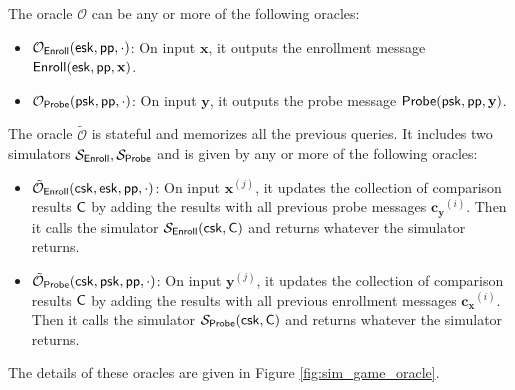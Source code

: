 The oracle $\mathcal{O}$ can be any or more of the following oracles:

\begin{itemize}

	\item $\mathcal{O}_{\sf Enroll}({\sf esk}, {\sf pp}, \cdot)$: On input $\mathbf{x}$, it outputs the enrollment message ${\sf Enroll}({\sf esk}, {\sf pp}, \mathbf{x})$.

	\item $\mathcal{O}_{\sf Probe}({\sf psk}, {\sf pp}, \cdot)$: On input $\mathbf{y}$, it outputs the probe message ${\sf Probe}({\sf psk}, {\sf pp}, \mathbf{y})$.

\end{itemize}

The oracle $\tilde{\mathcal{O}}$ is stateful and memorizes all the previous queries. It includes two simulators $\mathcal{S}_{\sf Enroll}, \mathcal{S}_{\sf Probe}$ and is given by any or more of the following oracles:

\begin{itemize}

	\item $\tilde{\mathcal{O}}_{\sf Enroll} ({\sf csk} ,{\sf esk}, {\sf pp}, \cdot)$: On input $\mathbf{x}^{(j)}$, it updates the collection of comparison results ${\sf C}$ by adding the results with all previous probe messages $\mathbf{c_y}^{(i)}$. Then it calls the simulator $\mathcal{S}_{\sf Enroll}({\sf csk}, {\sf C})$ and returns whatever the simulator returns.

	\item $\tilde{\mathcal{O}}_{\sf Probe} ({\sf csk}, {\sf psk}, {\sf pp}, \cdot)$: On input $\mathbf{y}^{(j)}$, it updates the collection of comparison results ${\sf C}$ by adding the results with all previous enrollment messages $\mathbf{c_x}^{(i)}$. Then it calls the simulator $\mathcal{S}_{\sf Probe}({\sf csk}, {\sf C})$ and returns whatever the simulator returns.

\end{itemize}

The details of these oracles are given in Figure \ref{fig:sim_game_oracle}.

